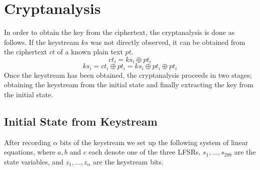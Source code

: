 \documentclass[conference]{IEEEtran}
\begin{document}
\section{Cryptanalysis}\label{sec:cryptanalysis}

In order to obtain the key from the ciphertext, the cryptanalysis is done as follows. If the keystream $ks$ was not directly observed, it can be obtained from the ciphertext $ct$ of a known plain text $pt$. 
$$ct_i = ks_i \oplus pt_i$$
$$ks_i = ct_i \oplus pt_i = ks_i \oplus pt_i \oplus pt_i$$
Once the keystream has been obtained, the cryptanalysis proceeds in two stages; obtaining the keystream from the initial state and finally extracting the key from the initial state.

\subsection{Initial State from Keystream}

After recording $\alpha$ bits of the keystream we set up the following system of linear equations, where $a,b$ and $c$ each denote one of the three LFSRs, $s_1,\dots,s_{288}$ are the state variables, and $z_1,\dots,z_{\alpha}$ are the keystream bits. 
\end{document}
